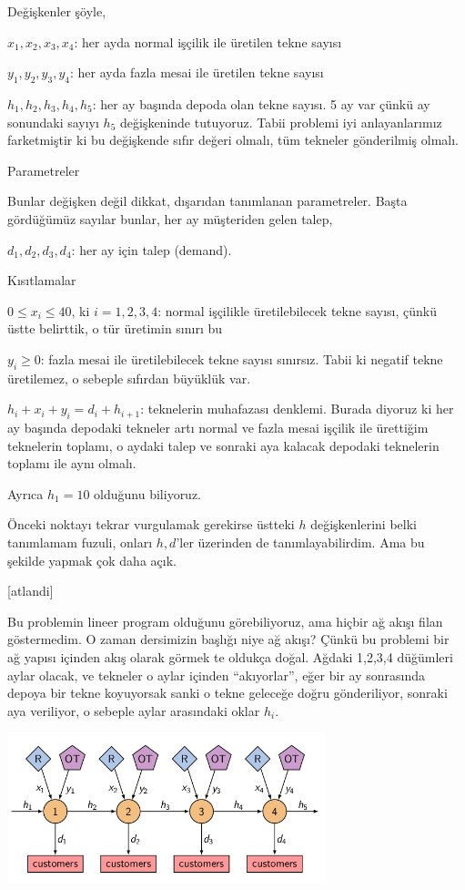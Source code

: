 \documentclass[12pt,fleqn]{article}\usepackage{../../common}
\begin{document}
Değişkenler şöyle,

$x_1,x_2,x_3,x_4$: her ayda normal işçilik ile üretilen tekne sayısı

$y_1,y_2,y_3,y_4$: her ayda fazla mesai ile üretilen tekne sayısı

$h_1,h_2,h_3,h_4,h_5$: her ay başında depoda olan tekne sayısı. 5 ay var
çünkü ay sonundaki sayıyı $h_5$ değişkeninde tutuyoruz. Tabii problemi iyi
anlayanlarımız farketmiştir ki bu değişkende sıfır değeri olmalı, tüm
tekneler gönderilmiş olmalı.

Parametreler

Bunlar değişken değil dikkat, dışarıdan tanımlanan parametreler. Başta
gördüğümüz sayılar bunlar, her ay müşteriden gelen talep, 

$d_1,d_2,d_3,d_4$: her ay için talep (demand). 

Kısıtlamalar

$0 \le x_i \le 40$, ki $i=1,2,3,4$: normal işçilikle üretilebilecek tekne
sayısı, çünkü üstte belirttik, o tür üretimin sınırı bu

$y_i \ge 0$: fazla mesai ile üretilebilecek tekne sayısı sınırsız. Tabii ki
negatif tekne üretilemez, o sebeple sıfırdan büyüklük var. 

$h_i + x_i + y_i = d_i + h_{i+1}$: teknelerin muhafazası denklemi. Burada
diyoruz ki her ay başında depodaki tekneler artı normal ve fazla mesai
işçilik ile ürettiğim teknelerin toplamı, o aydaki talep ve sonraki aya
kalacak depodaki teknelerin toplamı ile aynı olmalı. 

Ayrıca $h_1=10$ olduğunu biliyoruz.

Önceki noktayı tekrar vurgulamak gerekirse üstteki $h$ değişkenlerini belki
tanımlamam fuzuli, onları $h,d$'ler üzerinden de tanımlayabilirdim. Ama bu
şekilde yapmak çok daha açık. 

[atlandi]

Bu problemin lineer program olduğunu görebiliyoruz, ama hiçbir ağ akışı
filan göstermedim. O zaman dersimizin başlığı niye ağ akışı? Çünkü bu
problemi bir ağ yapısı içinden akış olarak görmek te oldukça doğal. 
Ağdaki 1,2,3,4 düğümleri aylar olacak, ve tekneler o aylar içinden
``akıyorlar'', eğer bir ay sonrasında depoya bir tekne koyuyorsak sanki o
tekne geleceğe doğru gönderiliyor, sonraki aya veriliyor, o sebeple aylar
arasındaki oklar $h_i$. 

\includegraphics[width=25em]{func_90_nflow_01.png}
\end{document}
